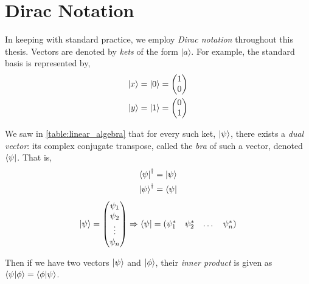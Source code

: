 \section{Dirac Notation}\label{sec:dirac_notation}
In keeping with standard practice, we employ \emph{Dirac notation} throughout this thesis. 
Vectors are denoted by \emph{kets} of the form $|a\rangle$. 
For example, the standard basis is represented by, 
\begin{equation}
    \begin{split}
    \ket{x} =  \ket{0} &= \left(\begin{matrix}1\\0\end{matrix}\right) 
    \\ \ket{y} = \ket{1} &= \left(\begin{matrix}0\\1\end{matrix}\right)
    \end{split}
\end{equation}
 
We saw in \cref{table:linear_algebra} that for every such ket, $\ket{\psi}$, there exists a \textit{dual vector}: 
    its complex conjugate transpose, called the \emph{bra} of such a vector, denoted $\bra{\psi}$. 
That is,
\begin{equation}
    \begin{split}
        \bra{\psi}^{\dag} &= \ket{\psi} 
        \\ \ket{\psi} ^{\dag} &= \bra{\psi}
    \end{split}
\end{equation}
\begin{equation}
    \ket{\psi} = \left(\begin{matrix}\psi_1 \\ \psi_2 \\ \vdots \\ \psi_n\end{matrix}\right) 
    \Rightarrow \bra{\psi}  = \begin{matrix}(\psi_1^{*} & \psi_2^{*} & \dots & \psi_n^{*})\end{matrix} 
\end{equation}

Then if we have two vectors $\ket{\psi} $ and $\ket{\phi}$, their \emph{inner product} is given as $ \braket{\psi | \phi}  = \braket{ \phi | \psi} $. 

